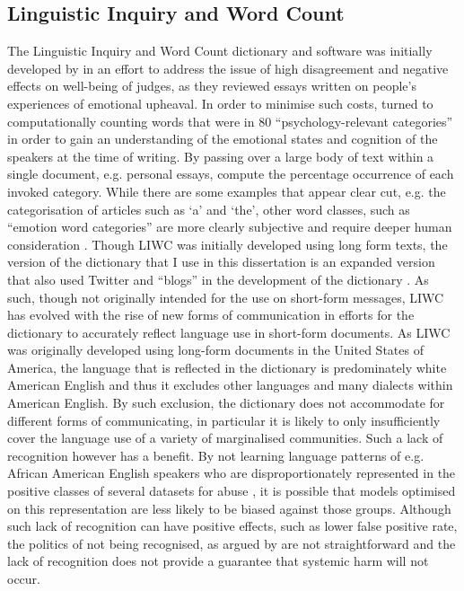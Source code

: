 \subsection{Linguistic Inquiry and Word Count}  
The Linguistic Inquiry and Word Count dictionary and software was initially developed by \citet{Pennebaker:2001} in an effort to address the issue of high disagreement and negative effects on well-being of judges, as they reviewed essays written on people's experiences of emotional upheaval.  
In order to minimise such costs, \citet{Pennebaker:2001} turned to computationally counting words that were in $80$ ``psychology-relevant categories'' in order to gain an understanding of the emotional states and cognition of the speakers at the time of writing.  
By passing over a large body of text within a single document, e.g. personal essays, \citet{Pennebaker:2001} compute the percentage occurrence of each invoked category.  
While there are some examples that appear clear cut, e.g. the categorisation of articles such as `a' and `the', other word classes, such as ``emotion word categories'' are more clearly subjective and require deeper human consideration \citep{Tausczik:2010}.  
Though LIWC was initially developed using long form texts, the version of the dictionary that I use in this dissertation is an expanded version that also used Twitter and ``blogs'' in the development of the dictionary \citep{Pennebaker:2015}.  
As such, though not originally intended for the use on short-form messages, LIWC has evolved with the rise of new forms of communication in efforts for the dictionary to accurately reflect language use in short-form documents.  
As LIWC was originally developed using long-form documents in the United States of America, the language that is reflected in the dictionary is predominately white American English and thus it excludes other languages and many dialects within American English.  
By such exclusion, the dictionary does not accommodate for different forms of communicating, in particular it is likely to only insufficiently cover the language use of a variety of marginalised communities.  
Such a lack of recognition however has a benefit.  
By not learning language patterns of e.g. African American English speakers who are disproportionately represented in the positive classes of several datasets for abuse \citep{Waseem:2018,Davidson:2019}, it is possible that models optimised on this representation are less likely to be biased against those groups.  
Although such lack of recognition can have positive effects, such as lower false positive rate, the politics of not being recognised, as argued by \citet{Benjamin:2019} are not straightforward and the lack of recognition does not provide a guarantee that systemic harm will not occur.  
